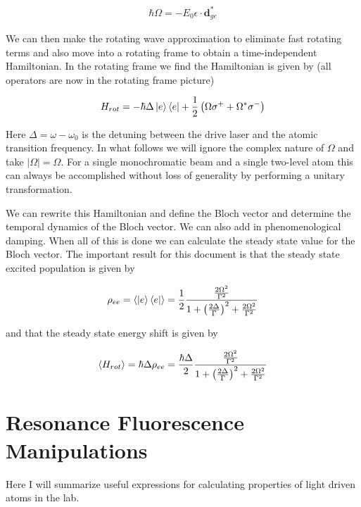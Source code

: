 \documentclass[12pt]{article}
\newcommand{\bv}[1]{\boldsymbol{#1}}
\begin{document}
\begin{align}
\hbar \Omega = -E_0 \epsilon \cdot\bv{d}_{ge}^*
\end{align}

We can then make the rotating wave approximation to eliminate fast rotating terms and also move into a rotating frame to obtain a time-independent Hamiltonian. In the rotating frame we find the Hamiltonian is given by (all operators are now in the rotating frame picture)

\begin{align}
H_{rot} = -\hbar \Delta \ket{e}\bra{e} + \frac{1}{2}\left(\Omega \sigma^+ + \Omega^* \sigma^- \right)
\end{align}

Here $\Delta = \omega -\omega_0$ is the detuning between the drive laser and the atomic transition frequency. In what follows we will ignore the complex nature of $\Omega$ and take $|\Omega| = \Omega$. For a single monochromatic beam and a single two-level atom this can always be accomplished without loss of generality by performing a unitary transformation.

We can rewrite this Hamiltonian and define the Bloch vector and determine the temporal dynamics of the Bloch vector. We can also add in phenomenological damping. When all of this is done we can calculate the steady state value for the Bloch vector. The important result for this document is that the steady state excited population is given by

\begin{align}
\rho_{ee} = \langle \ket{e}\bra{e} \rangle = \frac{1}{2} \frac{\frac{2\Omega^2}{\Gamma^2}}{1 + \left( \frac{2 \Delta}{\Gamma}\right)^2 + \frac{2\Omega^2}{\Gamma^2}}
\end{align}

and that the steady state energy shift is given by

\begin{align}
\Braket{H_{rot}} = \hbar \Delta \rho_{ee} = \frac{\hbar \Delta}{2} \frac{\frac{2\Omega^2}{\Gamma^2}}{1 + \left( \frac{2 \Delta}{\Gamma}\right)^2 + \frac{2\Omega^2}{\Gamma^2}}
\end{align}

\section{Resonance Fluorescence Manipulations}

Here I will summarize useful expressions for calculating properties of light driven atoms in the lab.
\end{document}
